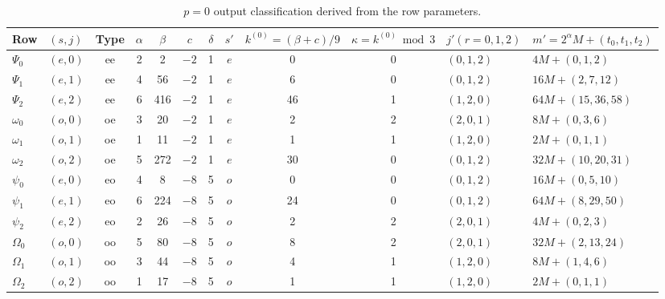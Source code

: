 \documentclass[11pt,letterpaper]{amsart}
\theoremstyle{definition}
\theoremstyle{plain}
\theoremstyle{plain}
\theoremstyle{remark}
\begin{document}
\begin{table}[H]
\centering
\small
\setlength{\tabcolsep}{3pt}
\renewcommand{\arraystretch}{1.10}

\caption{$p=0$ output classification derived from the row parameters.}
\label{tab:j-output-classification}

\begin{adjustbox}{max width=\linewidth}
\begin{tabular}{llccccccccll}
\toprule
Row & $(s,j)$ & Type & $\alpha$ & $\beta$ & $c$ & $\delta$ & $s'$ & $k^{(0)}=(\beta+c)/9$ & $\kappa=k^{(0)}\bmod 3$ & $j'(r=0,1,2)$ & $m' = 2^\alpha M + (t_0,t_1,t_2)$\\
\midrule
$\Psi_{0}$ & $(e,0)$ & ee & 2 & 2   & $-2$ & 1 & $e$ & 0  & 0 & $(0,1,2)$ & $4M + (0,1,2)$ \\
$\Psi_{1}$ & $(e,1)$ & ee & 4 & 56  & $-2$ & 1 & $e$ & 6  & 0 & $(0,1,2)$ & $16M + (2,7,12)$ \\
$\Psi_{2}$ & $(e,2)$ & ee & 6 & 416 & $-2$ & 1 & $e$ & 46 & 1 & $(1,2,0)$ & $64M + (15,36,58)$ \\
$\omega_{0}$ & $(o,0)$ & oe & 3 & 20  & $-2$ & 1 & $e$ & 2  & 2 & $(2,0,1)$ & $8M + (0,3,6)$ \\
$\omega_{1}$ & $(o,1)$ & oe & 1 & 11  & $-2$ & 1 & $e$ & 1  & 1 & $(1,2,0)$ & $2M + (0,1,1)$ \\
$\omega_{2}$ & $(o,2)$ & oe & 5 & 272 & $-2$ & 1 & $e$ & 30 & 0 & $(0,1,2)$ & $32M + (10,20,31)$ \\
$\psi_{0}$ & $(e,0)$ & eo & 4 & 8   & $-8$ & 5 & $o$ & 0  & 0 & $(0,1,2)$ & $16M + (0,5,10)$ \\
$\psi_{1}$ & $(e,1)$ & eo & 6 & 224 & $-8$ & 5 & $o$ & 24 & 0 & $(0,1,2)$ & $64M + (8,29,50)$ \\
$\psi_{2}$ & $(e,2)$ & eo & 2 & 26  & $-8$ & 5 & $o$ & 2  & 2 & $(2,0,1)$ & $4M + (0,2,3)$ \\
$\Omega_{0}$ & $(o,0)$ & oo & 5 & 80  & $-8$ & 5 & $o$ & 8  & 2 & $(2,0,1)$ & $32M + (2,13,24)$ \\
$\Omega_{1}$ & $(o,1)$ & oo & 3 & 44  & $-8$ & 5 & $o$ & 4  & 1 & $(1,2,0)$ & $8M + (1,4,6)$ \\
$\Omega_{2}$ & $(o,2)$ & oo & 1 & 17  & $-8$ & 5 & $o$ & 1  & 1 & $(1,2,0)$ & $2M + (0,1,1)$ \\
\bottomrule
\end{tabular}
\end{adjustbox}

\end{table}
\end{document}
